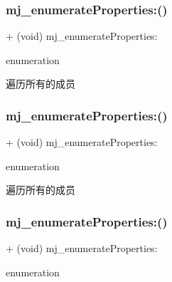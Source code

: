 \subsubsection{\texorpdfstring{mj\+\_\+enumerate\+Properties\+:()}{mj\_enumerateProperties:()}\hspace{0.1cm}{\footnotesize\ttfamily [1/3]}}
{\footnotesize\ttfamily + (void) mj\+\_\+enumerate\+Properties\+: \begin{DoxyParamCaption}\item[{(M\+J\+Properties\+Enumeration)}]{enumeration }\end{DoxyParamCaption}}

遍历所有的成员 \mbox{\label{category_n_s_object_07_m_j_property_08_a7fd9ddf78a279a82eaac01b08f6d6a1c}} 
\subsubsection{\texorpdfstring{mj\+\_\+enumerate\+Properties\+:()}{mj\_enumerateProperties:()}\hspace{0.1cm}{\footnotesize\ttfamily [2/3]}}
{\footnotesize\ttfamily + (void) mj\+\_\+enumerate\+Properties\+: \begin{DoxyParamCaption}\item[{(M\+J\+Properties\+Enumeration)}]{enumeration }\end{DoxyParamCaption}}

遍历所有的成员 \mbox{\label{category_n_s_object_07_m_j_property_08_a7fd9ddf78a279a82eaac01b08f6d6a1c}} 
\subsubsection{\texorpdfstring{mj\+\_\+enumerate\+Properties\+:()}{mj\_enumerateProperties:()}\hspace{0.1cm}{\footnotesize\ttfamily [3/3]}}
{\footnotesize\ttfamily + (void) mj\+\_\+enumerate\+Properties\+: \begin{DoxyParamCaption}\item[{(M\+J\+Properties\+Enumeration)}]{enumeration }\end{DoxyParamCaption}}

